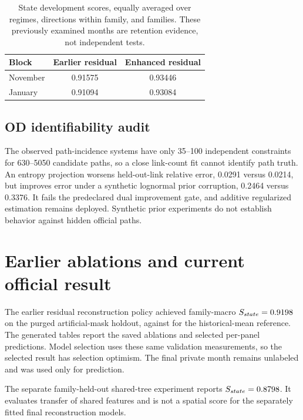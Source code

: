 \documentclass[conference]{IEEEtran}
\begin{document}
\begin{table}[t]\centering
\caption{State development scores, equally averaged over regimes, directions within family, and families. These previously examined months are retention evidence, not independent tests.}
\begin{tabular}{lcc}\hline
Block & Earlier residual & Enhanced residual\\\hline
November & 0.91575 & 0.93446 \\
January & 0.91094 & 0.93084 \\
\hline\end{tabular}\end{table}

\subsection{OD identifiability audit}
The observed path-incidence systems have only 35--100 independent constraints for 630--5050 candidate paths, so a close link-count fit cannot identify path truth. An entropy projection worsens held-out-link relative error, 0.0291 versus 0.0214, but improves error under a synthetic lognormal prior corruption, 0.2464 versus 0.3376. It fails the predeclared dual improvement gate, and additive regularized estimation remains deployed. Synthetic prior experiments do not establish behavior against hidden official paths.

\section{Earlier ablations and current official result}
The earlier residual reconstruction policy achieved family-macro $S_{state}=0.9198{}$ on the purged artificial-mask holdout, against \MacroSstateHist{} for the historical-mean reference. The generated tables report the saved ablations and selected per-panel predictions. Model selection uses these same validation measurements, so the selected result has selection optimism. The final private month remains unlabeled and was used only for prediction.



The separate family-held-out shared-tree experiment reports $S_{state}=0.8798{}$. It evaluates transfer of shared features and is not a spatial score for the separately fitted final reconstruction models.
\end{document}
